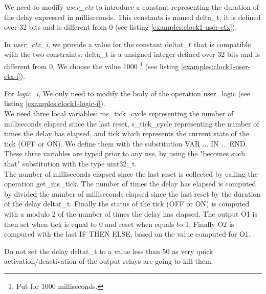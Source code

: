 We need to modify \textit{user\_ctx} to introduce a constant representing the duration of the delay expressed in milliseconds. This constants is named delta\_t; it is defined over 32 bits and is different from 0 (see listing \ref{examples:clock1-user-ctx}).



In \textit{user\_ctx\_i}, we provide a value for the constant deltat\_t that is compatible with the two constraints: delta\_t is a unsigned integer defined over 32 bits and is different from 0. We choose the value 1000 \footnote{Put for 1000 milliseconds.} (see listing \ref{examples:clock1-user-ctx-i}).



For \textit{logic\_i}, We only need to modify the body of the operation user\_logic (see listing \ref{examples:clock1-logic-i}). \\
We need three local variables: ms\_tick\_cycle representing the number of milliseconds elapsed since the last reset, s\_tick\_cycle representing the number of times the delay has elapsed, and tick which represents the current state of the tick (OFF or ON). We define them with the substitution VAR ... IN ... END.  These three variables are typed prior to any use, by using the "becomes such that" substitution with the type uint32\_t.\\
The  number of milliseconds elapsed since the last reset is collected by calling the operation get\_ms\_tick. The number of times the delay has elapsed is computed by divided the number of milliseconds elapsed since the last reset by the duration of the delay deltat\_t. Finally the status of the tick (OFF or ON) is computed with a modulo 2 of the number of times the delay has elapsed. The output O1 is then set when tick is equal to 0 and reset when equals to 1. Finally O2 is computed with the last IF THEN ELSE, based on the value computed for O1.

\begin{remark}
Do not set the delay deltat\_t to a value less than 50 as very quick activation/deactivation of the output relays are going to kill them.
\end{remark}

